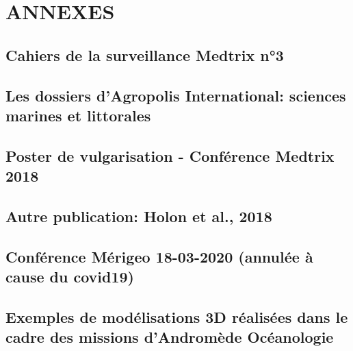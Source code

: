 \documentclass[11pt,a4paper]{book} %
\begin{document}
\part*{ANNEXES}
\pagestyle{appendix}
\clearpage
\begin{appendices}
	\noappendicestocpagenum
	\appendix
	
	\chapter{Cahiers de la surveillance Medtrix n°3} 
	\label{annexe-cahiers}
    
    
    \chapter[Les dossiers d'Agropolis International]{Les dossiers d'Agropolis International: sciences marines et littorales}
    \label{annexe-agropolis}
    
    
    \chapter{Poster de vulgarisation - Conférence Medtrix 2018} 
    \label{annexe-medtrix}
    
    
    \chapter{Autre publication: Holon et al., 2018} 
    \label{annexe-holon}
    
    
    \chapter{Conférence Mérigeo 18-03-2020 (annulée à cause du covid19)} 
    \label{annexe-merigeo}
    
    
    \chapter{Exemples de modélisations 3D réalisées dans le cadre des missions d'Andromède Océanologie} 
    \label{annexe-modelisations}
    
    

\end{appendices}
\end{document}
